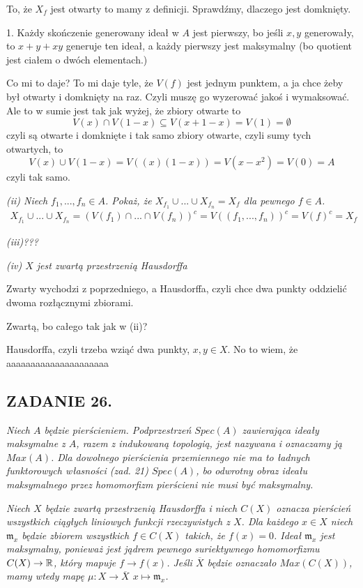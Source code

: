 \documentclass{article}
\begin{document}
To, że $X_f$ jest otwarty to mamy z definicji. Sprawdźmy, dlaczego jest domknięty.

1. Każdy skończenie generowany ideał w $A$ jest pierwszy, bo jeśli $x,y$ generowały, to $x+y+xy$ generuje ten ideał, a każdy pierwszy jest maksymalny (bo quotient jest ciałem o dwóch elementach.)

Co mi to daje? To mi daje tyle, że $V(f)$ jest jednym punktem, a ja chce żeby był otwarty i domknięty na raz. Czyli muszę go wyzerować jakoś i wymaksować. Ale to w sumie jest tak jak wyżej, że zbiory otwarte to
$$V(x)\cap V(1-x)\subseteq V(x+1-x)=V(1)=\emptyset$$
czyli są otwarte i domknięte i tak samo zbiory otwarte, czyli sumy tych otwartych, to
$$V(x)\cup V(1-x)=V((x)(1-x))=V(x-x^2)=V(0)=A$$
czyli tak samo.



\emph{\color{pink}(ii) Niech $f_1,...,f_n\in A$. Pokaż, że $X_{f_1}\cup...\cup X_{f_n}=X_f$ dla pewnego $f\in A$.}
\begin{align*}
    X_{f_1}\cup...\cup X_{f_n}=(V(f_1)\cap...\cap V(f_n))^c=V((f_1,...,f_n))^c=V(f)^c=X_f
\end{align*}

\emph{\color{yellow}(iii)???}

\emph{\color{yellow}(iv) $X$ jest zwartą przestrzenią Hausdorffa}

Zwarty wychodzi z poprzedniego, a Hausdorffa, czyli chce dwa punkty oddzielić dwoma rozłącznymi zbiorami. 

Zwartą, bo całego tak jak w (ii)?

Hausdorffa, czyli trzeba wziąć dwa punkty, $x,y\in X$. No to wiem, że aaaaaaaaaaaaaaaaaaaaa

\subsection*{ZADANIE 26.}
\emph{\color{pink}Niech $A$ będzie pierścieniem. Podprzestrzeń $Spec(A)$ zawierająca ideały maksymalne z $A$, razem z indukowaną topologią, jest nazywana}\emph{\color{pink} i oznaczamy ją $Max(A)$. Dla dowolnego pierścienia przemiennego nie ma to ładnych funktorowych własności (zad. 21) $Spec(A)$, bo odwrotny obraz ideału maksymalnego przez homomorfizm pierścieni nie musi być maksymalny.}

\emph{\color{pink}Niech $X$ będzie zwartą przestrzenią Hausdorffa i niech $C(X)$ oznacza pierścień wszystkich ciągłych liniowych funkcji rzeczywistych z $X$. Dla każdego $x\in X$ niech $\mathfrak{m}_x$ będzie zbiorem wszystkich $f\in C(X)$ takich, że $f(x)=0$. Ideał $\mathfrak{m}_x$ jest maksymalny, ponieważ jest jądrem pewnego suriektywnego homomorfizmu $C(X)\to\mathbb{R}$, który mapuje $f\to f(x)$. Jeśli $\overline X$ będzie oznaczało $Max(C(X))$, mamy wtedy mapę $\mu :X\to\overline X$ $x\mapsto \mathfrak{m}_x$.}
\end{document}
